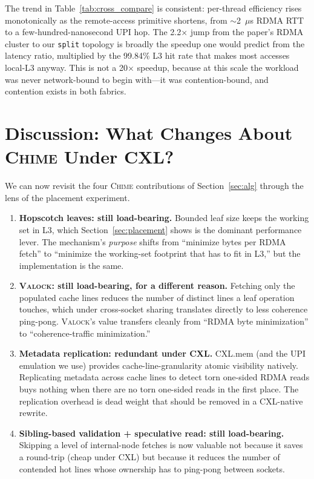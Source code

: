 \documentclass[11pt]{article}
\begin{document}
The trend in Table~\ref{tab:cross_compare} is consistent: per-thread efficiency rises monotonically as the remote-access primitive shortens, from $\sim$2~$\mu$s RDMA RTT to a few-hundred-nanosecond UPI hop. The 2.2$\times$ jump from the paper's RDMA cluster to our \texttt{split} topology is broadly the speedup one would predict from the latency ratio, multiplied by the 99.84\% L3 hit rate that makes most accesses local-L3 anyway. This is not a 20$\times$ speedup, because at this scale the workload was never network-bound to begin with---it was contention-bound, and contention exists in both fabrics.

\section{Discussion: What Changes About \textsc{Chime} Under CXL?}
\label{sec:discussion}
We can now revisit the four \textsc{Chime} contributions of Section~\ref{sec:alg} through the lens of the placement experiment.

\begin{enumerate}
    \item \textbf{Hopscotch leaves: still load-bearing.} Bounded leaf size keeps the working set in L3, which Section~\ref{sec:placement} shows is the dominant performance lever. The mechanism's \emph{purpose} shifts from ``minimize bytes per RDMA fetch'' to ``minimize the working-set footprint that has to fit in L3,'' but the implementation is the same.
    \item \textbf{\textsc{Valock}: still load-bearing, for a different reason.} Fetching only the populated cache lines reduces the number of distinct lines a leaf operation touches, which under cross-socket sharing translates directly to less coherence ping-pong. \textsc{Valock}'s value transfers cleanly from ``RDMA byte minimization'' to ``coherence-traffic minimization.''
    \item \textbf{Metadata replication: redundant under CXL.} CXL.mem (and the UPI emulation we use) provides cache-line-granularity atomic visibility natively. Replicating metadata across cache lines to detect torn one-sided RDMA reads buys nothing when there are no torn one-sided reads in the first place. The replication overhead is dead weight that should be removed in a CXL-native rewrite.
    \item \textbf{Sibling-based validation + speculative read: still load-bearing.} Skipping a level of internal-node fetches is now valuable not because it saves a round-trip (cheap under CXL) but because it reduces the number of contended hot lines whose ownership has to ping-pong between sockets.
\end{enumerate}
\end{document}
